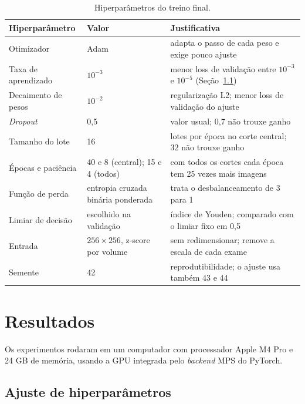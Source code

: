 \documentclass[12pt]{article}
\begin{document}
\begin{table}[ht]
\centering
\caption{Hiperparâmetros do treino final.}
\label{tab:hiper}
\footnotesize
\setlength{\tabcolsep}{4pt}
\begin{tabular}{@{}p{3.4cm}p{3.3cm}>{\raggedright\arraybackslash}p{7.5cm}@{}}
\toprule
Hiperparâmetro & Valor & Justificativa \\
\midrule
Otimizador & Adam & adapta o passo de cada peso e exige pouco ajuste \\
Taxa de aprendizado & $10^{-3}$ & menor loss de validação entre $10^{-3}$ e $10^{-5}$ (Seção~\ref{sec:ajuste}) \\
Decaimento de pesos & $10^{-2}$ & regularização L2; menor loss de validação do ajuste \\
\textit{Dropout} & 0,5 & valor usual; 0,7 não trouxe ganho \\
Tamanho do lote & 16 & 7 lotes por época no corte central; 32 não trouxe ganho \\
Épocas e paciência & 40 e 8 (central); 15 e 4 (todos) & com todos os cortes cada época tem 25 vezes mais imagens \\
Função de perda & entropia cruzada binária ponderada & trata o desbalanceamento de 3 para 1 \\
Limiar de decisão & escolhido na validação & índice de Youden; comparado com o limiar fixo em 0,5 \\
Entrada & $256{\times}256$, z-score por volume & sem redimensionar; remove a escala de cada exame \\
Semente & 42 & reprodutibilidade; o ajuste usa também 43 e 44 \\
\bottomrule
\end{tabular}
\end{table}

\FloatBarrier   %
\section{Resultados}
\label{sec:resultados}

Os experimentos rodaram em um computador com processador Apple M4 Pro e 24 GB de memória, usando a
GPU integrada pelo \textit{backend} MPS do PyTorch.

\subsection{Ajuste de hiperparâmetros}
\label{sec:ajuste}
\end{document}
